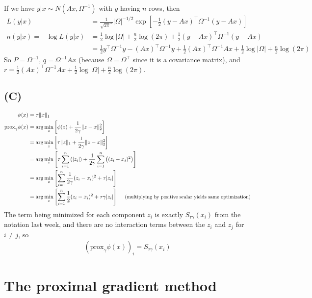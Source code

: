 \documentclass{article}
\begin{document}
If we have $ y | x \sim N(Ax, \Omega^{-1})$ with $y$ having $n$ rows, then
\begin{align*}
L(y | x)&=\frac{1}{\sqrt{2\pi}^n} |\Omega|^{-1/2} \exp\left[- \frac{1}{2}(y-Ax)^\top \Omega^{-1} (y-Ax)\right]\\
n(y|x)=-\log L(y|x)&=\frac{1}{2}\log |\Omega| +\frac{n}{2}\log(2\pi) + \frac{1}{2}(y-Ax)^\top \Omega^{-1} (y-Ax)\\
&=\frac{1}{2}y^\top \Omega^{-1} y - (Ax)^\top\Omega^{-1} y + \frac{1}{2}(Ax)^\top\Omega^{-1} Ax + \frac{1}{2}\log |\Omega| +\frac{n}{2}\log(2\pi)
\end{align*}
So $P=\Omega^{-1}$, $q=\Omega^{-1}Ax$ (because $\Omega=\Omega^\top$ since it is a covariance matrix), and $r=\frac{1}{2}(Ax)^\top\Omega^{-1} Ax + \frac{1}{2}\log |\Omega| +\frac{n}{2}\log(2\pi)$.


\subsection{(C)}
\begin{align*}
\phi(x)&=\tau \lVert x\rVert_1\\
\textrm{prox}_\gamma \phi(x)&=\arg\min_z \left[ \phi(z) + \frac{1}{2\gamma} \lVert z-x\rVert_2^2 \right]\\
&=\arg\min_z \left[ \tau \lVert z \rVert_1 + \frac{1}{2\gamma} \lVert z-x\rVert_2^2 \right]\\
&=\arg\min_z \left[ \tau \sum_{i=1}^n \left(|z_i|\right) + \frac{1}{2\gamma} \sum_{i=1}^n\left( (z_i-x_i)^2 \right) \right]\\
&=\arg\min_z \left[\sum_{i=1}^n \frac{1}{2\gamma}(z_i-x_i)^2 + \tau |z_i| \right]\\
&=\arg\min_z \left[\sum_{i=1}^n \frac{1}{2}(z_i-x_i)^2 + \tau\gamma |z_i| \right]~~~~{\small\textrm{(multiplying by positive scalar yields same optimization)}}
\end{align*}
The term being minimized for each component $z_i$ is exactly $S_{\tau\gamma}(x_i)$ from the notation last week, and
there are no interaction terms between the $z_i$ and $z_j$ for $i\neq j$, so
\begin{align*}
\left(\textrm{prox}_\gamma \phi(x)\right)_i=S_{\tau\gamma}(x_i)
\end{align*}


\section{The proximal gradient method}
\end{document}
